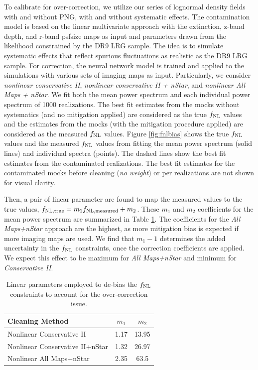 To calibrate for over-correction, we utilize our series of lognormal density fields with and without PNG, with and without systematic effects. The contamination model is based on the linear multivariate approach with the extinction, z-band depth, and r-band psfsize maps as input and parameters drawn from the likelihood constrained by the DR9 LRG sample. The idea is to simulate systematic effects that reflect spurious fluctuations as  realistic as the DR9 LRG sample. For correction, the neural network model is trained and applied to the simulations with various sets of imaging maps as input. Particularly, we consider \textit{nonlinear conservative II}, \textit{nonlinear conservative II + nStar}, and \textit{nonlinear All Maps + nStar}. We fit both the mean power spectrum and each individual power spectrum of 1000 realizations. The best fit estimates from the mocks without systematics (and no mitigation applied) are considered as the true $f_{\rm NL}$ values and the estimates from the mocks (with the mitigation procedure applied) are considered as the measured $f_{\rm NL}$ values. Figure \ref{fig:fnlbias} shows the true $f_{\rm NL}$ values and the measured $f_{\rm NL}$ values from fitting the mean power spectrum (solid lines) and individual spectra (points). The dashed lines show the best fit estimates from the contaminated realizations. The best fit estimates for the contaminated mocks before cleaning (\textit{no weight}) or per realizations are not shown for visual clarity. 

Then, a pair of linear parameter are found to map the measured values to the true values, $f_{\rm NL, true} = m_{1} f_{\rm NL, measured} + m_{2}$. These $m_{1}$ and $m_{2}$ coefficients for the mean power spectrum are summarized in Table \ref{tab:debiasparams}. The coefficients for the \textit{All Maps+nStar} approach are the highest, as more mitigation bias is expected if more imaging maps are used. We find that $m_{1}-1$ determines the added uncertainty in the $f_{\rm NL}$ constraints, once the correction coefficients are applied. We expect this effect to be maximum for \textit{All Maps+nStar} and minimum for \textit{Conservative II}.

\begin{table}
\begin{center}
\caption{Linear parameters employed to de-bias the $f_{\rm NL}$ constraints to account for the over-correction issue.}\label{tab:debiasparams}
\begin{tabular}{lcc}
\hline
\hline
\textbf{Cleaning Method} & $m_{1}$ & $m_{2}$ \\
\hline
Nonlinear Conservative II & 1.17 & 13.95 \\
Nonlinear Conservative II+nStar & 1.32 & 26.97 \\
Nonlinear All Maps+nStar & 2.35 & 63.5\\
\hline
\end{tabular}
\end{center}
\end{table}